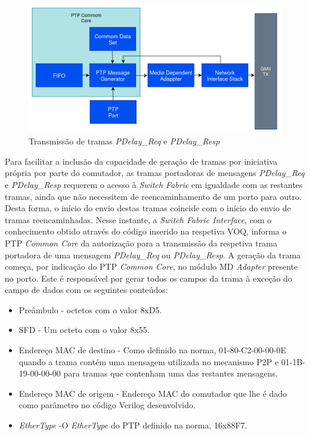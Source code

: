 \begin{figure}[H]
  \centering
  \includegraphics[width=1\textwidth]{PTP_Commom_Core.png}
  \caption[Transmissão de tramas \textit{PDelay\_Req} e \textit{PDelay\_Resp}]{Transmissão de tramas \textit{PDelay\_Req} e \textit{PDelay\_Resp}}
  \label{fig:airbus1}
\end{figure} 


Para facilitar a inclusão da capacidade de geração de tramas por iniciativa própria por parte do comutador, as tramas portadoras de mensagens \textit{PDelay\_Req} e \textit{PDelay\_Resp} requerem o acesso à \textit{Switch Fabric} em igualdade com as restantes tramas, ainda que não necessitem de reencaminhamento de um porto para outro. Desta forma, o início do envio destas tramas coincide com o início do envio de tramas reencaminhadas. Nesse instante, a \textit{Switch Fabric Interface}, com o conhecimento obtido através do código inserido na respetiva VOQ, informa o PTP \textit{Common Core} da autorização para a transmissão da respetiva trama portadora de uma mensagem \textit{PDelay\_Req} ou \textit{PDelay\_Resp}. A geração da trama começa, por indicação do PTP \textit{Common Core}, no módulo MD \textit{Adapter} presente no porto. Este é responsável por gerar todos os campos da trama à exceção do campo de dados com os seguintes conteúdos:


\begin{itemize}
  \item Preâmbulo - octetos com o valor 8xD5.
  \item SFD - \quad Um octeto com o valor 8x55.
  \item Endereço MAC de destino - \quad Como definido na norma, 01-80-C2-00-00-0E quando a trama contém uma mensagem utilizada no mecanismo P2P e 01-1B-19-00-00-00 para tramas que contenham uma das restantes mensagens.
  \item Endereço MAC de origem - \quad Endereço MAC do comutador que lhe é dado como parâmetro no código Verilog desenvolvido.
  \item \textit{EtherType} -\quad O \textit{EtherType} do PTP definido na norma, 16x88F7.
\end{itemize}


